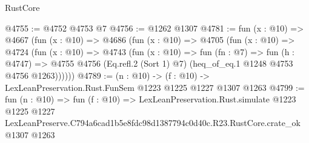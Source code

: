 \begin{lexlean}{RustCore}
\begin{coremodule}
@4755 := @4752 @4753 @7
@4756 := @1262 @1307
@4781 := fun (x : @10) =>
  @4667
    (fun (x : @10) =>
    @4686
      (fun (x : @10) =>
      @4705
        (fun (x : @10) =>
        @4724
          (fun (x : @10) =>
          @4743
            (fun (x : @10) =>
            fun (fn : @7) =>
            fun (h : @4747) =>
            @4755 @4756 (Eq.refl.{2} (Sort 1) @7) (heq_of_eq.{1} @1248 @4753 @4756 @1263))))))
@4789 := (n : @10) -> (f : @10) -> LexLeanPreservation.Rust.FunSem @1223 @1225 @1227 @1307 @1263
@4799 := fun (n : @10) =>
  fun (f : @10) =>
  LexLeanPreservation.Rust.simulate
    @1223
    @1225
    @1227
    LexLeanPreserve.C794a6cad1b5e8fdc98d1387794c0d40c.R23.RustCore.crate_ok
    @1307
    @1263
\end{coremodule}
\end{lexlean}
